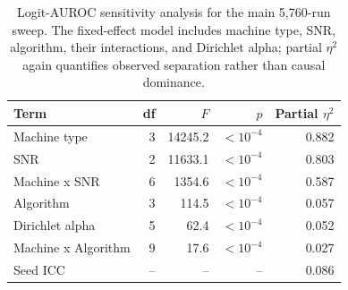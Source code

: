 \begin{table}[t]
\centering
\caption{Logit-AUROC sensitivity analysis for the main 5,760-run sweep. The fixed-effect model includes machine type, SNR, algorithm, their interactions, and Dirichlet alpha; partial $\eta^2$ again quantifies observed separation rather than causal dominance.}
\label{tab:p1-logit-effect-sizes}
\scriptsize
\setlength{\tabcolsep}{2.5pt}
\begin{tabular}{@{}lrrrr@{}}
\toprule
Term & df & $F$ & $p$ & Partial $\eta^2$ \\
\midrule
Machine type & 3 & 14245.2 & $<10^{-4}$ & 0.882 \\
SNR & 2 & 11633.1 & $<10^{-4}$ & 0.803 \\
Machine x SNR & 6 & 1354.6 & $<10^{-4}$ & 0.587 \\
Algorithm & 3 & 114.5 & $<10^{-4}$ & 0.057 \\
Dirichlet alpha & 5 & 62.4 & $<10^{-4}$ & 0.052 \\
Machine x Algorithm & 9 & 17.6 & $<10^{-4}$ & 0.027 \\
\midrule
Seed ICC & -- & -- & -- & 0.086 \\
\bottomrule
\end{tabular}
\end{table}
